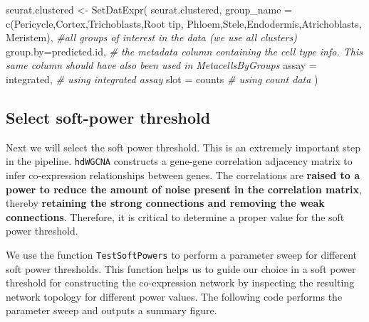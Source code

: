\documentclass[
  letterpaper,
  DIV=11,
  numbers=noendperiod]{scrartcl}
\newenvironment{Shaded}{}{}
\newcommand{\AttributeTok}[1]{\textcolor[rgb]{0.49,0.56,0.16}{#1}}
\newcommand{\CommentTok}[1]{\textcolor[rgb]{0.38,0.63,0.69}{\textit{#1}}}
\newcommand{\FunctionTok}[1]{\textcolor[rgb]{0.02,0.16,0.49}{#1}}
\newcommand{\NormalTok}[1]{#1}
\newcommand{\OtherTok}[1]{\textcolor[rgb]{0.00,0.44,0.13}{#1}}
\newcommand{\StringTok}[1]{\textcolor[rgb]{0.25,0.44,0.63}{#1}}
\begin{document}
\begin{Shaded}
\begin{Highlighting}[]
\NormalTok{seurat.clustered }\OtherTok{\textless{}{-}} \FunctionTok{SetDatExpr}\NormalTok{(}
\NormalTok{  seurat.clustered,}
  \AttributeTok{group\_name =} \FunctionTok{c}\NormalTok{(}\StringTok{\textquotesingle{}Pericycle\textquotesingle{}}\NormalTok{,}\StringTok{\textquotesingle{}Cortex\textquotesingle{}}\NormalTok{,}\StringTok{\textquotesingle{}Trichoblasts\textquotesingle{}}\NormalTok{,}\StringTok{\textquotesingle{}Root tip\textquotesingle{}}\NormalTok{,}
                 \StringTok{\textquotesingle{}Phloem\textquotesingle{}}\NormalTok{,}\StringTok{\textquotesingle{}Stele\textquotesingle{}}\NormalTok{,}\StringTok{\textquotesingle{}Endodermis\textquotesingle{}}\NormalTok{,}\StringTok{\textquotesingle{}Atrichoblasts\textquotesingle{}}\NormalTok{,}
                 \StringTok{\textquotesingle{}Meristem\textquotesingle{}}\NormalTok{), }\CommentTok{\#all groups of interest in the data (we use all clusters)}
  \AttributeTok{group.by=}\StringTok{\textquotesingle{}predicted.id\textquotesingle{}}\NormalTok{, }\CommentTok{\# the metadata column containing the cell type info. This same column should have also been used in MetacellsByGroups}
  \AttributeTok{assay =} \StringTok{\textquotesingle{}integrated\textquotesingle{}}\NormalTok{, }\CommentTok{\# using integrated assay}
  \AttributeTok{slot =} \StringTok{\textquotesingle{}counts\textquotesingle{}} \CommentTok{\# using count data}
\NormalTok{)}
\end{Highlighting}
\end{Shaded}

\subsection{Select soft-power
threshold}\label{select-soft-power-threshold}

Next we will select the soft power threshold. This is an extremely
important step in the pipeline. \texttt{hdWGCNA} constructs a gene-gene
correlation adjacency matrix to infer co-expression relationships
between genes. The correlations are \textbf{raised to a power to reduce
the amount of noise present in the correlation matrix}, thereby
\textbf{retaining the strong connections and removing the weak
connections}. Therefore, it is critical to determine a proper value for
the soft power threshold.

We use the function \texttt{TestSoftPowers} to perform a parameter sweep
for different soft power thresholds. This function helps us to guide our
choice in a soft power threshold for constructing the co-expression
network by inspecting the resulting network topology for different power
values. The following code performs the parameter sweep and outputs a
summary figure.
\end{document}
